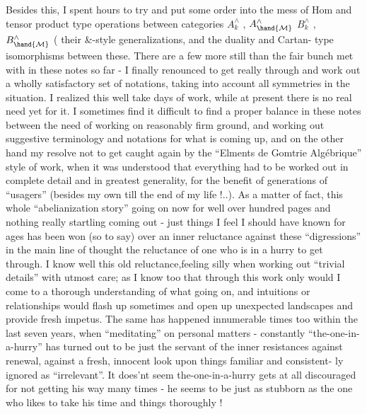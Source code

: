 
Besides this,  I spent hours to try and put some order into the mess
of  Hom and tensor product type operations between categories $A^{\wedge}_{k}$ , $A^{\wedge}_{\hand{\mathcal{M}}}$
$B^{\wedge}_{k}$ , $B^{\wedge}_{\hand{\mathcal{M}}}$ (  their \&-style generalizations\hand{)}, and the duality and Cartan-%
type isomorphisms between these.  There are a few more still than the
fair bunch met with in these notes so far  -  I finally renounced to get
really through and work out a wholly satisfactory set of notations,
taking into account all symmetries in the situation.  I realized this
  well take days of work,  while at present there is no real
need yet for it.  I sometimes find it difficult to find a proper balance
in these notes between the need of working on reasonably firm ground,
and  working out suggestive terminology and notations for
what is coming up,  and on the other hand my resolve not to get caught
 again by the ``Elments de Gomtrie Algébrique'' style of work,
when it was understood that everything had to be worked out in complete
detail and in greatest generality,  for the benefit of generations of
``usagers'' (besides my own till the end of my life !..).  As a matter of
fact,  this whole ``abelianization story''\hand{,} going on now for well over 
hundred pages and nothing really startling coming out  -  just things I
feel I should have known for ages\hand{,} \deleted{-} has been won (so to say) over an
inner reluctance against these ``digressions'' in the main line of thought\hand{,}
the reluctance of one who is in a hurry to get through.  I know well
this old reluctance,feeling silly when working out ``trivial details'' 
with utmost care;  as I know too that through this work only would I
come to a thorough understanding of what  going on,  and  
intuitions or relationships would flash up sometimes and open up
unexpected landscapes  and provide fresh impetus.  The same has happened
innumerable times too within the last seven years,  when ``meditating''
on personal matters  -  constantly ``the-one-in-a-hurry'' has turned out
to be just the servant of the inner resistances against renewal,
against a fresh, innocent look upon things \hand{\unsure{,}}familiar\hand{,} and  consistent-%
ly ignored as ``irrelevant''.  It does'nt seem the-one-in-a-hurry gets
at all discouraged for not getting his way many times  -  he seems to be
just as stubborn as the one who likes to take his time and   things
thoroughly !


